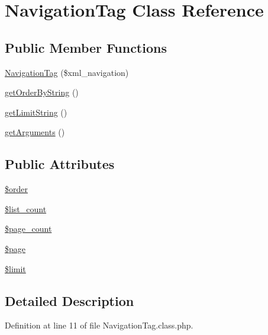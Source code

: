 \hypertarget{classNavigationTag}{\section{Navigation\+Tag Class Reference}
\label{classNavigationTag}
}
\subsection*{Public Member Functions}
\begin{DoxyCompactItemize}
\item 
\hyperlink{classNavigationTag_a91495b131102c08b0e926ec2df903c1f}{Navigation\+Tag} (\$xml\+\_\+navigation)
\item 
\hyperlink{classNavigationTag_a5d0ad196e149753b1adb58a1883f369d}{get\+Order\+By\+String} ()
\item 
\hyperlink{classNavigationTag_a9adb174f58ed2ef92137970d0a7b2c81}{get\+Limit\+String} ()
\item 
\hyperlink{classNavigationTag_a05afcf00355b39311b716e35e68789a6}{get\+Arguments} ()
\end{DoxyCompactItemize}
\subsection*{Public Attributes}
\begin{DoxyCompactItemize}
\item 
\hyperlink{classNavigationTag_a67fea0de20a4e7bf16df396c69171799}{\$order}
\item 
\hyperlink{classNavigationTag_a0d79757d75c3a0cfc3d38db7346349a4}{\$list\+\_\+count}
\item 
\hyperlink{classNavigationTag_a1aaaffcb475c1edc0a93539c59a92ce9}{\$page\+\_\+count}
\item 
\hyperlink{classNavigationTag_a095ee63f01c7ae4c6e66854521c88371}{\$page}
\item 
\hyperlink{classNavigationTag_a322d95f82cadac06f257815e2bcc28a3}{\$limit}
\end{DoxyCompactItemize}


\subsection{Detailed Description}


Definition at line 11 of file Navigation\+Tag.\+class.\+php.



